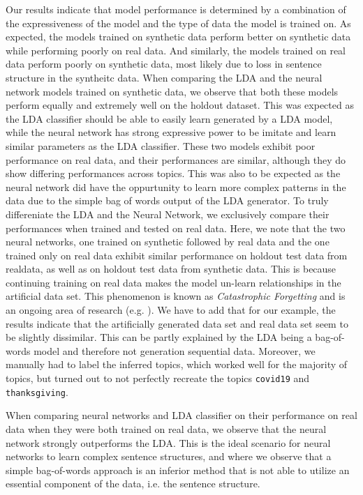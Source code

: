 \documentclass[11pt]{article}
\begin{document}
Our results indicate that model performance is determined by a combination of the expressiveness of the model and the type of data the model is trained on. As expected, the models trained on synthetic data perform better on synthetic data while performing poorly on real data. And similarly, the models trained on real data perform poorly on synthetic data, most likely due to loss in sentence structure in the syntheitc data. When comparing the LDA and the neural network models trained on synthetic data, we observe that both these models perform equally and extremely well on the holdout dataset. This was expected as the LDA classifier should be able to easily learn generated by a LDA model, while the neural network has strong expressive power to be imitate and learn similar parameters as the LDA classifier. These two models exhibit poor performance on real data, and their performances are similar, although they do show differing performances across topics. This was also to be expected as the neural network did have the oppurtunity to learn more complex patterns in the data due to the simple bag of words output of the LDA generator. To truly differeniate the LDA and the Neural Network, we exclusively compare their performances when trained and tested on real data. Here, we note that the two neural networks, one trained on synthetic followed by real data and the one trained only on real data exhibit similar performance on holdout test data from realdata, as well as on holdout test data from synthetic data. This is because continuing training on real data makes the model un-learn relationships in the artificial data set. This phenomenon is known as \emph{Catastrophic Forgetting} and is an ongoing area of research (e.g. \cite{kaushik2021understanding}). We have to add that for our example, the results indicate that the artificially generated data set and real data set seem to be slightly dissimilar. This can be partly explained by the LDA being a bag-of-words model and therefore not generation sequential data. Moreover, we manually had to label the inferred topics, which worked well for the majority of topics, but turned out to not perfectly recreate the topics \texttt{covid19} and \texttt{thanksgiving}.  

When comparing neural networks and LDA classifier on their performance on real data when they were both trained on real data, we observe that the neural network strongly outperforms the LDA. This is the ideal scenario for neural networks to learn complex sentence structures, and where we observe that a simple bag-of-words approach is an inferior method that is not able to utilize an essential component of the data, i.e. the sentence structure. 
\end{document}
